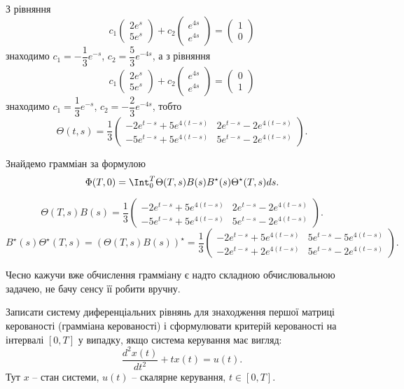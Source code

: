 \begin{solution}
    З рівняння
    \[ c_1 \begin{pmatrix} 2e^s \\ 5e^s \end{pmatrix} + c_2 \begin{pmatrix} e^{4s} \\ e^{4s} \end{pmatrix} = \begin{pmatrix} 1 \\ 0 \end{pmatrix} \]
    знаходимо $c_1 = -\dfrac13 e^{-s}$, $c_2 = \dfrac53 e^{-4s}$, а з рівняння
    \[ c_1 \begin{pmatrix} 2e^s \\ 5e^s \end{pmatrix} + c_2 \begin{pmatrix} e^{4s} \\ e^{4s} \end{pmatrix} = \begin{pmatrix} 0 \\ 1 \end{pmatrix} \]
    знаходимо $c_1 = \dfrac13 e^{-s}$, $c_2 = -\dfrac23 e^{-4s}$, тобто
    \[ \Theta(t, s) = \dfrac13\begin{pmatrix} -2 e^{t-s} + 5 e^{4(t-s)} & 2 e^{t-s} - 2 e^{4(t-s)} \\ -5 e^{t-s} + 5 e^{4(t-s)} & 5 e^{t-s} - 2 e^{4(t-s)} \end{pmatrix}. \]
    
    Знайдемо грамміан за формулою \[\Phi(T, 0) = \Int_0^T \Theta(T, s) B(s) B^\star (s) \Theta^\star(T, s) ds. \]
    
    \[ \Theta(T, s) B(s) =  \dfrac13\begin{pmatrix} -2 e^{t-s} + 5 e^{4(t-s)} & 2 e^{t-s} - 2 e^{4(t-s)} \\ -5 e^{t-s} + 5 e^{4(t-s)} & 5 e^{t-s} - 2 e^{4(t-s)} \end{pmatrix}. \]
    \[ B^\star (s) \Theta^\star(T, s)  =  (\Theta(T, s) B(s))^\star =  \dfrac13\begin{pmatrix} -2 e^{t-s} + 5 e^{4(t-s)} & 5 e^{t-s} - 5 e^{4(t-s)} \\ -2 e^{t-s} + 2 e^{4(t-s)} & 5 e^{t-s} - 2 e^{4(t-s)} \end{pmatrix}. \]
    
    Чесно кажучи вже обчислення грамміану є надто складною обчислювальною задачею, не бачу сенсу її робити вручну.
\end{solution}

\setcounter{problem}{12}
\begin{problem}
    Записати систему диференціальних рівнянь для знаходження першої матриці керованості (грамміана керованості) і сформулювати критерій керованості на інтервалі $[0, T]$ у випадку, якщо система керування має вигляд:
    \[ \dfrac{d^2x(t)}{dt^2} + tx(t) = u(t). \]
    Тут $x$ -- стан системи, $u(t)$ -- скалярне керування, $t \in [0, T]$.
\end{problem}

